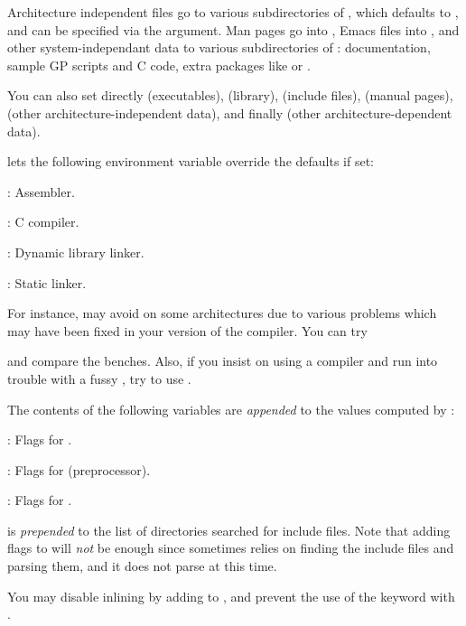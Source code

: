 Architecture independent files go to various subdirectories of
, which defaults to , and can be
specified via the  argument. Man pages go into
, Emacs files into
, and other system-independant data
to various subdirectories of : documentation,
sample GP scripts and C code, extra packages like  or
.

\noindent You can also set directly  (executables),
 (library),  (include files), 
(manual pages),  (other architecture-independent data), and
finally  (other architecture-dependent data).

  lets the following environment
variable override the defaults if set:

: Assembler.

: C compiler.

: Dynamic library linker.

: Static linker.

\noindent For instance,  may avoid  on some
architectures due to various problems which may have been fixed in your
version of the compiler. You can try


\noindent and compare the benches. Also, if you insist on using a 
compiler and run into trouble with a fussy , try to use
.


\noindent The contents of the following variables are \emph{appended} to the
values computed by :

: Flags for .

: Flags for  (preprocessor).

: Flags for .

 is \emph{prepended} to the list of directories
searched for include files. Note that adding  flags to
 will \emph{not} be enough since  sometimes
relies on finding the include files and parsing them, and it does not 
parse  at this time.

You may disable inlining by adding  to ,
and prevent the use of the  keyword with
.

